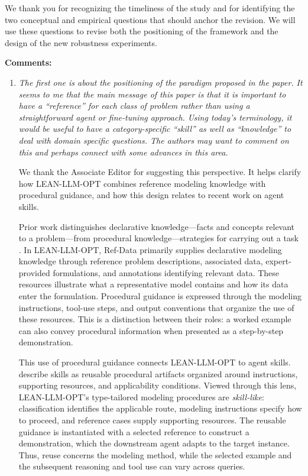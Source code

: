 \documentclass[11pt]{article}
\newcommand{\edit}[1]{{\color{hopkins-blue}\itshape #1}}
\begin{document}
We thank you for recognizing the timeliness of the study and for identifying the two conceptual and empirical questions that should anchor the revision. We will use these questions to revise both the positioning of the framework and the design of the new robustness experiments.

\noindent\textbf{Comments:}

\begin{enumerate}[label=(AssoE.\arabic*),leftmargin=*]

\item \edit{The first one is about the positioning of the paradigm proposed in the paper. It seems to me that the main message of this paper is that it is important to have a ``reference'' for each class of problem rather than using a straightforward agent or fine-tuning approach. Using today's terminology, it would be useful to have a category-specific ``skill'' as well as ``knowledge'' to deal with domain specific questions. The authors may want to comment on this and perhaps connect with some advances in this area.}\label{asso-1}

We thank the Associate Editor for suggesting this perspective.
It helps clarify how LEAN-LLM-OPT combines reference modeling
knowledge with procedural guidance, and how this design relates
to recent work on agent skills.

Prior work distinguishes declarative knowledge---facts and
concepts relevant to a problem---from procedural
knowledge---strategies for carrying out a task
\citep{ae1_li2024metacognitive}. In LEAN-LLM-OPT, Ref-Data
primarily supplies declarative modeling knowledge through
reference problem descriptions, associated data, expert-provided
formulations, and annotations identifying relevant data.
These resources illustrate what a representative model contains
and how its data enter the formulation. Procedural guidance is
expressed through the modeling instructions, tool-use steps,
and output conventions that organize the use of these resources.
This is a distinction between their roles: a worked example
can also convey procedural information when presented as a
step-by-step demonstration.

This use of procedural guidance connects LEAN-LLM-OPT to agent
skills. \citet{ae1_zhou2026skillsurvey} describe skills as reusable
procedural artifacts organized around instructions, supporting
resources, and applicability conditions. Viewed through this
lens, LEAN-LLM-OPT's type-tailored modeling procedures are
\emph{skill-like}: classification identifies the applicable
route, modeling instructions specify how to proceed, and
reference cases supply supporting resources. The reusable
guidance is instantiated with a selected reference to construct
a demonstration, which the downstream agent adapts to the
target instance. Thus, reuse concerns the modeling method,
while the selected example and the subsequent reasoning and
tool use can vary across queries.


\end{enumerate}
\end{document}
